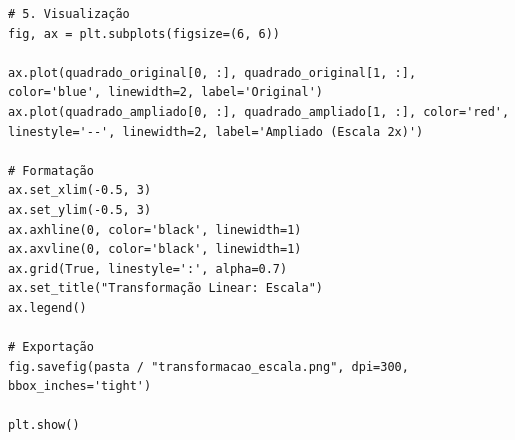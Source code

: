 \documentclass[../numerical_methods.tex]{subfiles}
\begin{document}
\begin{listing}[H]
	\begin{verbatim}
# 5. Visualização
fig, ax = plt.subplots(figsize=(6, 6))

ax.plot(quadrado_original[0, :], quadrado_original[1, :], color='blue', linewidth=2, label='Original')
ax.plot(quadrado_ampliado[0, :], quadrado_ampliado[1, :], color='red', linestyle='--', linewidth=2, label='Ampliado (Escala 2x)')

# Formatação
ax.set_xlim(-0.5, 3)
ax.set_ylim(-0.5, 3)
ax.axhline(0, color='black', linewidth=1)
ax.axvline(0, color='black', linewidth=1)
ax.grid(True, linestyle=':', alpha=0.7)
ax.set_title("Transformação Linear: Escala")
ax.legend()

# Exportação
fig.savefig(pasta / "transformacao_escala.png", dpi=300, bbox_inches='tight')

plt.show()
\end{verbatim}
\end{listing}
\end{document}
